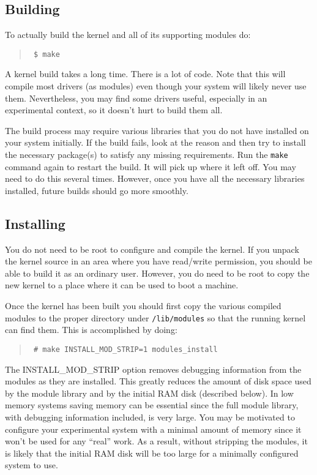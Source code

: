 \documentclass{article}
\newcommand{\command}[1]{\texttt{#1}}
\newcommand{\filename}[1]{\texttt{#1}}
\newenvironment{commands}
  {\begin{quote} \tt}
  {\end{quote}}
\begin{document}
\subsection{Building}
\label{sec:building}

To actually build the kernel and all of its supporting modules do:
\begin{commands}
  \$ make
\end{commands}

A kernel build takes a long time. There is a lot of code. Note that this will compile most
drivers (as modules) even though your system will likely never use them. Nevertheless, you may
find some drivers useful, especially in an experimental context, so it doesn't hurt to build
them all.

The build process may require various libraries that you do not have installed on your system
initially. If the build fails, look at the reason and then try to install the necessary
package(s) to satisfy any missing requirements. Run the \command{make} command again to restart
the build. It will pick up where it left off. You may need to do this several times. However,
once you have all the necessary libraries installed, future builds should go more smoothly.

\subsection{Installing}

You do not need to be root to configure and compile the kernel. If you unpack the kernel source
in an area where you have read/write permission, you should be able to build it as an ordinary
user. However, you do need to be root to copy the new kernel to a place where it can be used to
boot a machine.

Once the kernel has been built you should first copy the various compiled modules to the proper
directory under \filename{/lib/modules} so that the running kernel can find them. This is
accomplished by doing:
\begin{commands}
  \# make INSTALL\_MOD\_STRIP=1 modules\_install
\end{commands}

The INSTALL\_MOD\_STRIP option removes debugging information from the modules as they are
installed. This greatly reduces the amount of disk space used by the module library and by the
initial RAM disk (described below). In low memory systems saving memory can be essential since
the full module library, with debugging information included, is very large. You may be
motivated to configure your experimental system with a minimal amount of memory since it won't
be used for any ``real'' work. As a result, without stripping the modules, it is likely that the
initial RAM disk will be too large for a minimally configured system to use.
\end{document}
